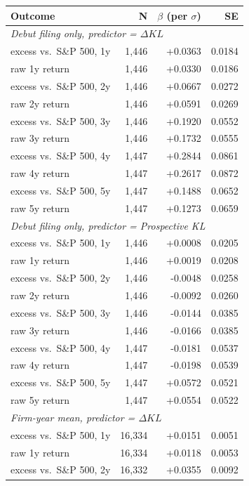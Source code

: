 \begin{tabular}{lrrr}
\toprule
Outcome & N & $\beta$ (per $\sigma$) & SE \\
\midrule
\multicolumn{4}{l}{\textit{Debut filing only, predictor = $\Delta KL$}} \\
\midrule
excess vs.\ S\&P 500, 1y & 1,446 & +0.0363 & 0.0184 \\
raw 1y return & 1,446 & +0.0330 & 0.0186 \\
excess vs.\ S\&P 500, 2y & 1,446 & +0.0667 & 0.0272 \\
raw 2y return & 1,446 & +0.0591 & 0.0269 \\
excess vs.\ S\&P 500, 3y & 1,446 & +0.1920 & 0.0552 \\
raw 3y return & 1,446 & +0.1732 & 0.0555 \\
excess vs.\ S\&P 500, 4y & 1,447 & +0.2844 & 0.0861 \\
raw 4y return & 1,447 & +0.2617 & 0.0872 \\
excess vs.\ S\&P 500, 5y & 1,447 & +0.1488 & 0.0652 \\
raw 5y return & 1,447 & +0.1273 & 0.0659 \\
\midrule
\multicolumn{4}{l}{\textit{Debut filing only, predictor = Prospective KL}} \\
\midrule
excess vs.\ S\&P 500, 1y & 1,446 & +0.0008 & 0.0205 \\
raw 1y return & 1,446 & +0.0019 & 0.0208 \\
excess vs.\ S\&P 500, 2y & 1,446 & -0.0048 & 0.0258 \\
raw 2y return & 1,446 & -0.0092 & 0.0260 \\
excess vs.\ S\&P 500, 3y & 1,446 & -0.0144 & 0.0385 \\
raw 3y return & 1,446 & -0.0166 & 0.0385 \\
excess vs.\ S\&P 500, 4y & 1,447 & -0.0181 & 0.0537 \\
raw 4y return & 1,447 & -0.0198 & 0.0539 \\
excess vs.\ S\&P 500, 5y & 1,447 & +0.0572 & 0.0521 \\
raw 5y return & 1,447 & +0.0554 & 0.0522 \\
\midrule
\multicolumn{4}{l}{\textit{Firm-year mean, predictor = $\Delta KL$}} \\
\midrule
excess vs.\ S\&P 500, 1y & 16,334 & +0.0151 & 0.0051 \\
raw 1y return & 16,334 & +0.0118 & 0.0053 \\
excess vs.\ S\&P 500, 2y & 16,332 & +0.0355 & 0.0092 \\

\end{tabular}
